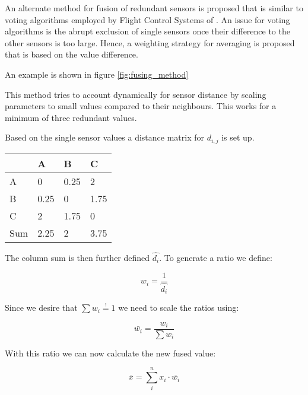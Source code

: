 
An alternate method for fusion of redundant sensors is proposed that is similar to voting algorithms employed by Flight Control Systems of \cite{tischler_advances_2018}. An issue for voting algorithms is the abrupt exclusion of single sensors once their difference to the other sensors is too large. Hence, a weighting strategy for averaging is proposed that is based on the value difference.

An example is shown in figure \ref{fig:fusing_method}

This method tries to account dynamically for sensor distance by scaling parameters to small values compared to their neighbours. This works for a minimum of three redundant values.

Based on the single sensor values a distance matrix for $d_{i,j}$ is set up.

\begin{table}[]
    \begin{tabular}{@{}llll@{}}
        \toprule                 & A    & B    & C    \\ \midrule
        \multicolumn{1}{l|}{A}   & 0    & 0.25 & 2    \\
        \multicolumn{1}{l|}{B}   & 0.25 & 0    & 1.75 \\
        \multicolumn{1}{l|}{C}   & 2    & 1.75 & 0    \\ \midrule
        \multicolumn{1}{l|}{Sum} & 2.25 & 2    & 3.75 \\ \bottomrule
    \end{tabular}
\end{table}

The column sum is then further defined $\hat{d_{i}}$. To generate a ratio we define:

\begin{equation}
    w_i=\frac{1}{\hat{d_i}}
    \label{eq:fusing_weight}
\end{equation}

Since we desire that
$\sum{w_i}\overset{!}{=}1$ we need to scale the ratios using:

\begin{equation}
    \bar{w_{i}} = \frac{w_i}{\sum{w_i}}
\end{equation}


With this ratio we can now calculate the new fused value:

\begin{equation}
    \bar{x} = \sum_{i}^{n} x_i \cdot \bar{w_{i}}
\end{equation}


